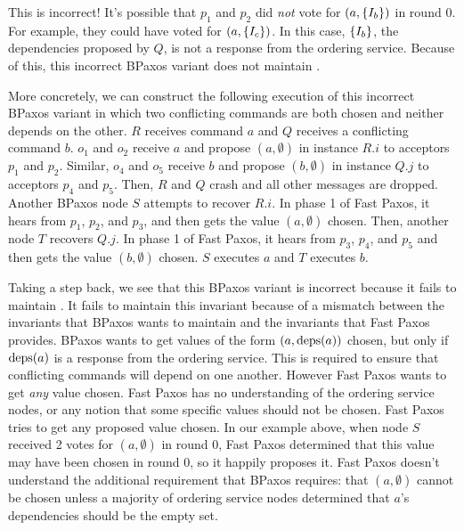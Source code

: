 This is incorrect! It's possible that $p_1$ and $p_2$ did \emph{not} vote for
$(a, \{I_b\})$ in round $0$. For example, they could have voted for $(a,
\{I_c\})$. In this case, $\{I_b\}$, the dependencies proposed by $Q$, is
not a response from the ordering service. Because of this, this incorrect
BPaxos variant does not maintain .

More concretely, we can construct the following execution of this incorrect
BPaxos variant in which two conflicting commands are both chosen and neither
depends on the other. $R$ receives command $a$ and $Q$ receives a conflicting
command $b$.  $o_1$ and $o_2$ receive $a$ and propose $(a, \emptyset)$ in
instance $R.i$ to acceptors $p_1$ and $p_2$. Similar, $o_4$ and $o_5$ receive
$b$ and propose $(b, \emptyset)$ in instance $Q.j$ to acceptors $p_4$ and
$p_5$. Then, $R$ and $Q$ crash and all other messages are dropped. Another
BPaxos node $S$ attempts to recover $R.i$. In phase 1 of Fast Paxos, it hears
from $p_1$, $p_2$, and $p_3$, and then gets the value $(a, \emptyset)$ chosen.
Then, another node $T$ recovers $Q.j$. In phase 1 of Fast Paxos, it hears from
$p_3$, $p_4$, and $p_5$ and then gets the value $(b, \emptyset)$ chosen. $S$
executes $a$ and $T$ executes $b$.

Taking a step back, we see that this BPaxos variant is incorrect because it
fails to maintain . It fails to maintain this
invariant because of a mismatch between the invariants that BPaxos wants to
maintain and the invariants that Fast Paxos provides. BPaxos wants to get
values of the form $(a, \text{deps}(a))$ chosen, but only if $\text{deps}(a)$ is a response
from the ordering service. This is required to ensure that conflicting commands
will depend on one another. However Fast Paxos wants to get \emph{any} value
chosen. Fast Paxos has no understanding of the ordering service nodes, or any
notion that some specific values should not be chosen. Fast Paxos tries to get
any proposed value chosen. In our example above, when node $S$ received 2 votes
for $(a, \emptyset)$ in round 0, Fast Paxos determined that this value may have
been chosen in round 0, so it happily proposes it. Fast Paxos doesn't
understand the additional requirement that BPaxos requires: that $(a,
\emptyset)$ cannot be chosen unless a majority of ordering service nodes
determined that $a$'s dependencies should be the empty set.

